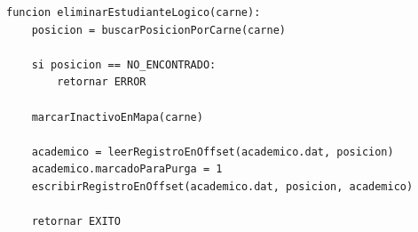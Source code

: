 \begin{lstlisting}[style=pseudocodigo]
funcion eliminarEstudianteLogico(carne):
    posicion = buscarPosicionPorCarne(carne)

    si posicion == NO_ENCONTRADO:
        retornar ERROR

    marcarInactivoEnMapa(carne)

    academico = leerRegistroEnOffset(academico.dat, posicion)
    academico.marcadoParaPurga = 1
    escribirRegistroEnOffset(academico.dat, posicion, academico)

    retornar EXITO
\end{lstlisting}
